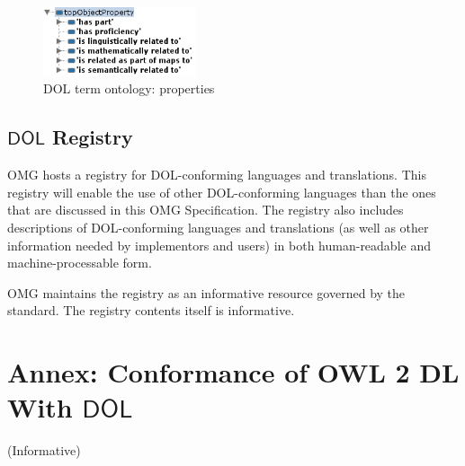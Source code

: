 \documentclass[10pt,fleqn,final]{scrreprt}
\newcommand*{\termref}[1]{\index{#1}#1\xspace}
\newcommand*{\IS}{OMG Specification\xspace}
\newcommand*{\DOL}{\ensuremath{\mathsf{DOL}}\xspace}
\newcommand{\informative}[0]{{\begin{center}{\Large{(Informative})}\end{center}} \bigskip}
\newcommand{\infannex}[1]{ \chapter{Annex: #1}  \informative }
\newenvironment{definitions}[0]{\medskip }{}
\begin{document}
\begin{definitions}
\begin{figure}
  \centering
    \includegraphics[width=0.4\textwidth]{illustrations/dol-onto-properties.png}
  \caption{DOL term ontology: properties}
  \label{fig:dol-onto-properties}
\end{figure}




\section{\DOL Registry}\label{a:registry}

OMG hosts a registry for DOL-conforming languages and translations. This registry will enable the 
 use of other DOL-conforming languages than the ones that are discussed in this OMG Specification. 
The registry also includes descriptions of DOL-conforming languages and translations (as well as 
 other information needed by implementors and users) in both human-readable and 
machine-processable form.

OMG maintains the registry as an informative resource governed by the standard. The registry 
 contents itself is informative. 

%
%


\infannex{Conformance of OWL 2 DL With \DOL}\label{a:owl}


\end{definitions}
\end{document}
